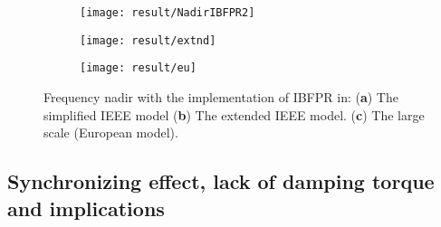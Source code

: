 \begin{figure}[h]
	\centering
	\begin{subfigure}[h]{0.49\textwidth}
		\centering
		\texttt{[image: result/NadirIBFPR2]}
		\caption{}
		\label{fig:res_ieee_ibfpr}
	\end{subfigure}
	\hfill
	\begin{subfigure}[h]{0.49\textwidth}
		\centering
		\texttt{[image: result/extnd]}
		\caption{}
		\label{fig:res_extd_ibfpr}
	\end{subfigure}
	\hfill
	\begin{subfigure}[h]{0.49\textwidth}
		\centering
		\texttt{[image: result/eu]}
		\caption{}
		\label{fig:res_euro_ibfpr}
	\end{subfigure}
	
	
	\caption{Frequency nadir with the implementation of IBFPR in: (\textbf{a}) The simplified IEEE model  (\textbf{b}) The extended IEEE model. (\textbf{c}) The large scale (European model). }
\end{figure}



\subsection{Synchronizing effect, lack of damping torque and implications}


